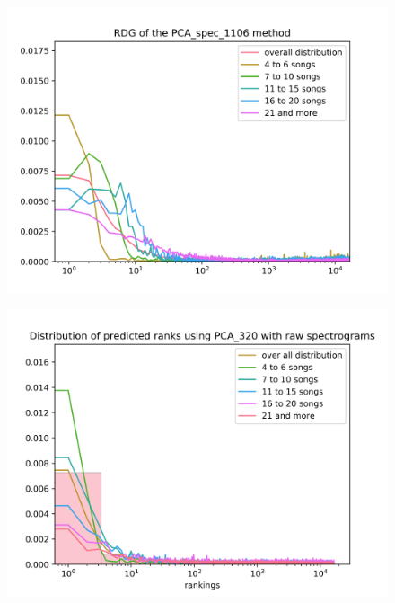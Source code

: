 \begin{figure}[h]
\centering
\begin{minipage}{.5\textwidth}
  \centering
  \includegraphics[width=1\linewidth]{./img/pca_spec_1106_graph.png}
  \label{fig:pca_spec_1106_distribution}
\end{minipage}%
\begin{minipage}{.5\textwidth}
  \centering
  \includegraphics[width=1\linewidth]{./img/pca_spec_320_graph.png}
  \label{fig:pca_spec_320_distribution}
\end{minipage}
\end{figure}

